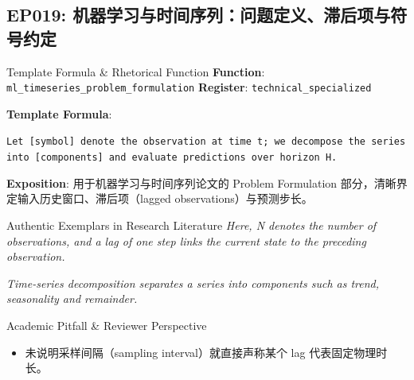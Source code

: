 \subsection{EP019: 机器学习与时间序列：问题定义、滞后项与符号约定}\label{sec:ep:EP019}
\begin{ConceptBox}{Template Formula \& Rhetorical Function}
\textbf{Function}: \texttt{ml\_timeseries\_problem\_formulation} \quad \textbf{Register}: \texttt{technical\_specialized}\par\vspace{3pt}
\textbf{Template Formula}:\par\noindent\texttt{Let [symbol] denote the observation at time t; we decompose the series into [components] and evaluate predictions over horizon H.}\par\vspace{4pt}
\textbf{Exposition}: 用于机器学习与时间序列论文的 Problem Formulation 部分，清晰界定输入历史窗口、滞后项（lagged observations）与预测步长。
\end{ConceptBox}
\begin{ExampleBox}{Authentic Exemplars in Research Literature}
\textit{Here, N denotes the number of observations, and a lag of one step links the current state to the preceding observation.}\par\vspace{2pt}
\textit{Time-series decomposition separates a series into components such as trend, seasonality and remainder.}\par\vspace{2pt}
\end{ExampleBox}
\begin{TipBox}{Academic Pitfall \& Reviewer Perspective}
\begin{itemize}[leftmargin=1.5em, itemsep=1pt]
  \item 未说明采样间隔（sampling interval）就直接声称某个 lag 代表固定物理时长。
\end{itemize}
\end{TipBox}
\vspace{6pt}
